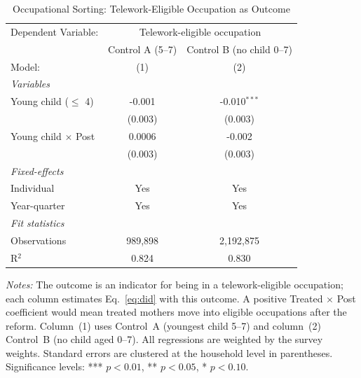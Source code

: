 
\begin{table}[H]
   \caption{\label{tab:mech_allocation} Occupational Sorting: Telework-Eligible Occupation as Outcome}
   \centering
\small\setlength{\tabcolsep}{5pt}
   \begin{tabular}{lcc}
      \toprule
      Dependent Variable: & \multicolumn{2}{c}{Telework-eligible occupation}\\
                                 & Control A (5--7) & Control B (no child 0--7) \\   
\addlinespace[2pt]
      Model:                     & (1)              & (2)\\  
      \midrule
      \emph{Variables}\\
      Young child ($\leq$ 4)     & -0.001           & -0.010$^{***}$\\   
                                 & (0.003)          & (0.003)\\   
\addlinespace[2pt]
      Young child $\times$ Post  & 0.0006           & -0.002\\   
                                 & (0.003)          & (0.003)\\   
\addlinespace[2pt]
      \midrule
      \emph{Fixed-effects}\\
      Individual                 & Yes              & Yes\\  
      Year-quarter               & Yes              & Yes\\  
      \midrule
      \emph{Fit statistics}\\
      Observations               & 989,898          & 2,192,875\\  
      R$^2$                      & 0.824            & 0.830\\  
\bottomrule
   \end{tabular}
   
   \par \raggedright 
   \footnotesize\textit{Notes:} The outcome is an indicator for being in a telework-eligible occupation; each column estimates Eq.~\eqref{eq:did} with this outcome. A positive Treated $\times$ Post coefficient would mean treated mothers move into eligible occupations after the reform. Column~(1) uses Control~A (youngest child 5--7) and column~(2) Control~B (no child aged 0--7). All regressions are weighted by the survey weights. Standard errors are clustered at the household level in parentheses. Significance levels: *** $p<0.01$, ** $p<0.05$, * $p<0.10$.
\end{table}


